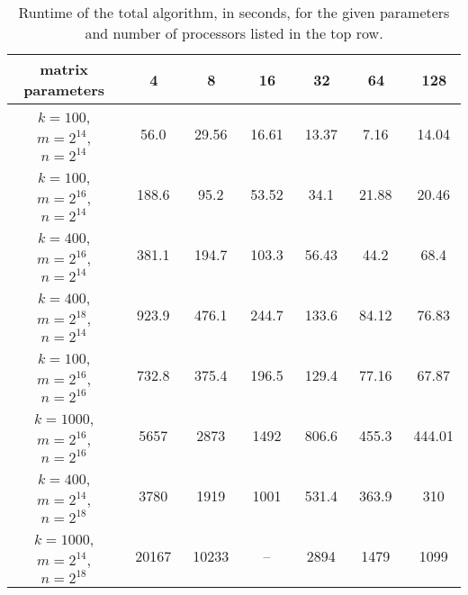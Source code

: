 \documentclass[11pt]{article}
\begin{document}
\begin{table}[here]
\centering
\begin{tabular}{|c|c|c|c|c|c|c|}\hline
matrix parameters &\ 4 &\ 8 &\ 16 &\ 32 &\ 64 &\ 128  \\ \hline
$k=100$, $m=2^{14}$, $n=2^{14}$ &\ 56.0 &\ 29.56  &\  16.61  &\  13.37 &\  7.16  &\ 14.04  \\ 
$k=100$, $m=2^{16}$, $n=2^{14}$ &\  188.6 &\ 95.2  &\ 53.52  &\ 34.1  &\ 21.88   &\  20.46  \\ 
$k=400$, $m=2^{16}$, $n=2^{14}$ &\ 381.1   &\  194.7 &\  103.3   &\  56.43   &\  44.2  &\  68.4  \\ 
$k=400$, $m=2^{18}$, $n=2^{14}$ &\ 923.9  &\  476.1 &\  244.7 &\ 133.6  &\  84.12  &\  76.83 \\ 
$k=100$, $m=2^{16}$, $n=2^{16}$ &\  732.8 &\  375.4 &\ 196.5  &\  129.4 &\  77.16   &\ 67.87  \\ 
$k=1000$, $m=2^{16}$, $n=2^{16}$ &\   5657 &\  2873 &\ 1492  &\  806.6 &\   455.3 &\  444.01 \\ 
$k=400$, $m=2^{14}$, $n=2^{18}$ &\ 3780  &\  1919 &\   1001 &\  531.4 &\  363.9   &\  310  \\ 
$k=1000$, $m=2^{14}$, $n=2^{18}$ &\  20167 &\ 10233 &\  -- &\  2894 &\    1479 &\  1099  \\  \hline
\end{tabular}
\caption{Runtime of the total algorithm, in seconds, for the given parameters and number of processors listed in the top row.}
\label{bigt}
\end{table}
\end{document}
